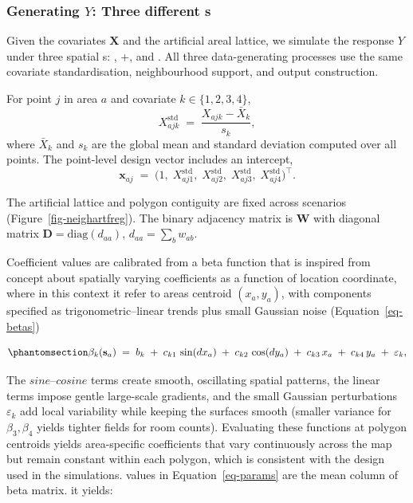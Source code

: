 \documentclass[
  letterpaper,
  DIV=11,
  numbers=noendperiod]{scrartcl}
\begin{document}
\endgroup{}

\subsubsection{\texorpdfstring{Generating \(Y\): Three different
s}{Generating Y: Three different s}}\label{generating-y-three-different-s}

Given the covariates \(\mathbf X\) and the artificial areal lattice, we
simulate the response \(Y\) under three spatial s: ,
+, and . All three data-generating processes
use the same covariate standardisation, neighbourhood support, and
output construction.

For point \(j\) in area \(a\) and covariate \(k\in\{1,2,3,4\}\), \[
X_{ajk}^{\text{std}} \;=\; \frac{X_{ajk} - \bar X_k}{s_k},
\] where \(\bar X_k\) and \(s_k\) are the global mean and standard
deviation computed over all points. The point-level design vector
includes an intercept, \[
\mathbf x_{aj} \;=\; \big(1,\;X_{aj1}^{\text{std}},\;X_{aj2}^{\text{std}},\;X_{aj3}^{\text{std}},\;X_{aj4}^{\text{std}}\big)^\top .
\]

The artificial lattice and polygon contiguity are fixed across scenarios
(Figure~\ref{fig-neighartfreg}). The binary adjacency matrix is
\(\mathbf W\) with diagonal matrix \(\mathbf D=\mathrm{diag}(d_{aa})\),
\(d_{aa}=\sum_b w_{ab}\).

Coefficient values are calibrated from a beta function that is inspired
from  concept about spatially varying coefficients as a
function of location coordinate, where in this context it refer to areas
centroid \((x_a, y_a)\), with components specified as
trigonometric--linear trends plus small Gaussian noise
(Equation~\ref{eq-betas})

\begin{equation}\phantomsection\label{eq-betas}{
\beta_k(\mathbf s_a)
\;=\;
b_k
\;+\; c_{k1}\,\sin(dx_a)
\;+\; c_{k2}\,\cos(dy_a)
\;+\; c_{k3}\,x_a
\;+\; c_{k4}\,y_a
\;+\; \varepsilon_k ,
}\end{equation}

The \(sine–cosine\) terms create smooth, oscillating spatial patterns,
the linear terms impose gentle large-scale gradients, and the small
Gaussian perturbations \(\varepsilon_k\) add local variability while
keeping the surfaces smooth (smaller variance for \(\beta_3,\beta_4\)
yields tighter fields for room counts). Evaluating these functions at
polygon centroids yields area-specific coefficients that vary
continuously across the map but remain constant within each polygon,
which is consistent with the  design used in the simulations.
values in Equation~\ref{eq-params} are the mean column of beta matrix.
it yields:
\end{document}
